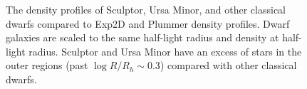 \begin{figure}
\centering
{}
\caption[Classical dwarf density profiles]{The density profiles of
Sculptor, Ursa Minor, and other classical dwarfs compared to Exp2D and
Plummer density profiles. Dwarf galaxies are scaled to the same
half-light radius and density at half-light radius. Sculptor and Ursa
Minor have an excess of stars in the outer regions (past
\(\log R/R_h \sim 0.3\)) compared with other classical
dwarfs.}\label{fig:classical_dwarfs_densities}
\end{figure}

